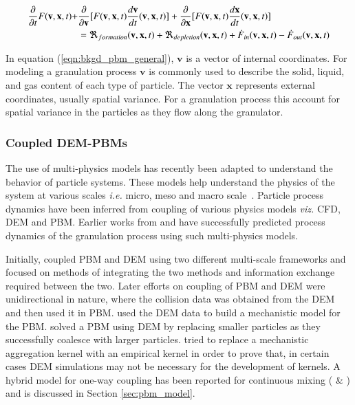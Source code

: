 \documentclass[preprint,11pt,authoryear]{elsarticle}
\begin{document}
    \begin{align}
    \frac{ \partial}{\partial t}F(\textbf{v},\textbf{x},t) +& \frac{\partial}{\partial 
        \textbf{v}}[F(\textbf{v},\textbf{x},t)\frac{d\textbf{v}}{dt}(\textbf{v},\textbf{x},t)] + 
    \frac{\partial}{\partial \textbf{x}}[F(\textbf{v},\textbf{x},t)\frac{d\textbf{x}}{dt}(\textbf{v},\textbf{x},t)] 
    \notag\\
    &= 
    \Re_{formation}(\textbf{v},\textbf{x},t)+\Re_{depletion}(\textbf{v},\textbf{x},t)+\dot{F}_{in}(\textbf{v},
    \textbf{x},t)-\dot{F}_{out}(\textbf{v},\textbf{x},t)
    \label{eqn:bkgd_pbm_general} 
    \end{align}
    
In equation (\ref{eqn:bkgd_pbm_general}), $\textbf{v}$ is a vector of internal coordinates. For 
modeling a granulation process $\textbf{v}$ is commonly used to describe the solid, liquid, and gas 
content of each type of particle. The vector $\textbf{x}$ represents external coordinates, usually 
spatial variance. For a granulation process this  account for spatial variance in the particles as they 
flow along the granulator.

\subsubsection{Coupled DEM-PBMs}
The use of multi-physics models has recently been adapted to understand the behavior of 
particle systems. These models help understand the physics of the system at various scales 
\textit{i.e.} micro, meso and macro scale~\citep{sen2014}. Particle process dynamics have been 
inferred from coupling of various physics models \textit{viz.} CFD, 
DEM and PBM. Earlier works from \cite{sen2014} and \cite{Barrasso2015cerd} have successfully 
predicted process dynamics of the granulation process using such multi-physics models.

Initially, \cite{ingram2005} coupled PBM and DEM using two different multi-scale frameworks and 
focused on methods of integrating the two methods and information exchange required between the 
two. Later efforts on coupling of PBM and DEM were unidirectional in nature, where the collision 
data was obtained from the DEM and then used it in PBM. \cite{gantt2006} used the DEM data 
to build a mechanistic model for the PBM. \cite{Goldschmidt2003} solved a PBM using DEM by 
replacing smaller particles as they successfully coalesce with larger particles. 
\cite{Reinhold2012} tried to replace a mechanistic aggregation kernel with an empirical kernel 
in order to prove that, in certain cases DEM simulations may not be necessary for the 
development of kernels. A hybrid model for one-way coupling has been reported for continuous mixing (\cite{sen2013} \&  \cite{sen2013b}) and is discussed in Section \ref{sec:pbm_model}.
\end{document}
